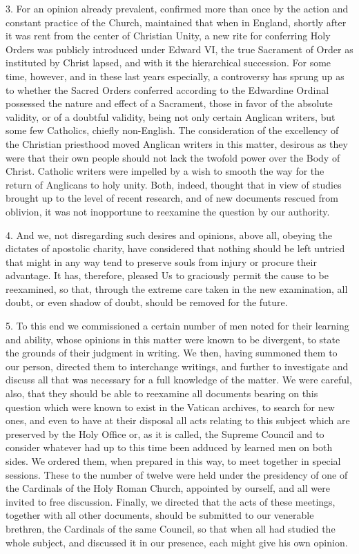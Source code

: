 3. For an opinion already prevalent, confirmed more than once by the
action and constant practice of the Church, maintained that when in
England, shortly after it was rent from the center of Christian Unity, a
new rite for conferring Holy Orders was publicly introduced under Edward
VI, the true Sacrament of Order as instituted by Christ lapsed, and with
it the hierarchical succession. For some time, however, and in these
last years especially, a controversy has sprung up as to whether the
Sacred Orders conferred according to the Edwardine Ordinal possessed the
nature and effect of a Sacrament, those in favor of the absolute
validity, or of a doubtful validity, being not only certain Anglican
writers, but some few Catholics, chiefly non-English. The consideration
of the excellency of the Christian priesthood moved Anglican writers in
this matter, desirous as they were that their own people should not lack
the twofold power over the Body of Christ. Catholic writers were
impelled by a wish to smooth the way for the return of Anglicans to holy
unity. Both, indeed, thought that in view of studies brought up to the
level of recent research, and of new documents rescued from oblivion, it
was not inopportune to reexamine the question by our authority.

4. And we, not disregarding such desires and opinions, above all,
obeying the dictates of apostolic charity, have considered that nothing
should be left untried that might in any way tend to preserve souls from
injury or procure their advantage. It has, therefore, pleased Us to
graciously permit the cause to be reexamined, so that, through the
extreme care taken in the new examination, all doubt, or even shadow of
doubt, should be removed for the future.

5. To this end we commissioned a certain number of men noted for their
learning and ability, whose opinions in this matter were known to be
divergent, to state the grounds of their judgment in writing. We then,
having summoned them to our person, directed them to interchange
writings, and further to investigate and discuss all that was necessary
for a full knowledge of the matter. We were careful, also, that they
should be able to reexamine all documents bearing on this question which
were known to exist in the Vatican archives, to search for new ones, and
even to have at their disposal all acts relating to this subject which
are preserved by the Holy Office or, as it is called, the Supreme
Council and to consider whatever had up to this time been adduced by
learned men on both sides. We ordered them, when prepared in this way,
to meet together in special sessions. These to the number of twelve were
held under the presidency of one of the Cardinals of the Holy Roman
Church, appointed by ourself, and all were invited to free discussion.
Finally, we directed that the acts of these meetings, together with all
other documents, should be submitted to our venerable brethren, the
Cardinals of the same Council, so that when all had studied the whole
subject, and discussed it in our presence, each might give his own
opinion.


